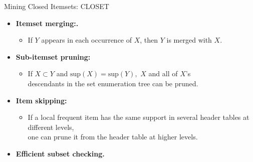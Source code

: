\begin{frame}{Mining Closed Itemsets: CLOSET}
	\begin{itemize}
		\item \textbf{Itemset merging:.}
		      \begin{itemize}
			      \item If $Y$ appears in each occurrence of $X$, then $Y$ is merged
			            with $X$.
		      \end{itemize}
		\item \textbf{Sub-itemset pruning:}
		      \begin{itemize}
			      \item If $X \subset Y$ and $\text{sup}(X) = \text{sup}(Y),$ $X$ and
			            all of $X$'s\\
			            descendants in the set enumeration tree can be pruned.
		      \end{itemize}
		\item \textbf{Item skipping:}
		      \begin{itemize}
			      \item If a local frequent item has the same support in several
			            header tables at different levels, \\
			            one can prune it from the header table at higher levels.
		      \end{itemize}
		\item \textbf{Efficient subset checking.}
	\end{itemize}
\end{frame}

